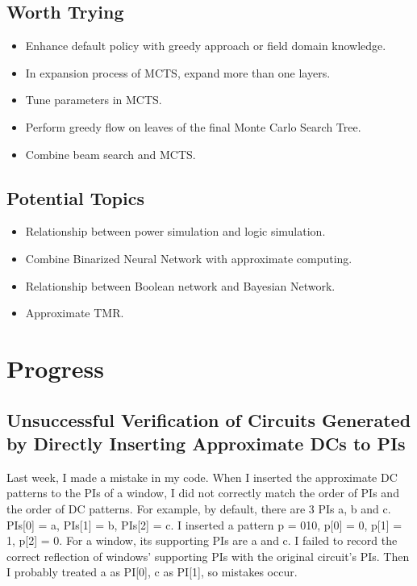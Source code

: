 \documentclass{rpt}
\begin{document}
\subsection{Worth Trying}
\begin{itemize}
    \item Enhance default policy with greedy approach or field domain knowledge.
    \item In expansion process of MCTS, expand more than one layers.
    \item Tune parameters in MCTS\@.
    \item Perform greedy flow on leaves of the final Monte Carlo Search Tree.
    \item Combine beam search and MCTS\@.
\end{itemize}

\subsection{Potential Topics}
\begin{itemize}
    \item Relationship between power simulation and logic simulation.
    \item Combine Binarized Neural Network with approximate computing.
    \item Relationship between Boolean network and Bayesian Network.
    \item Approximate TMR\@.
\end{itemize}

\section{Progress}

\subsection{Unsuccessful Verification of Circuits Generated by Directly Inserting Approximate DCs to PIs}
Last week,
I made a mistake in my code.
When I inserted the approximate DC patterns to the PIs of a window,
I did not correctly match the order of PIs and the order of DC patterns.
For example,
by default,
there are 3 PIs a, b and c.
PIs[0] = a, PIs[1] = b, PIs[2] = c.
I inserted a pattern p = 010,
p[0] = 0, p[1] = 1, p[2] = 0.
For a window,
its supporting PIs are a and c.
I failed to record the correct reflection of windows' supporting PIs with the original circuit's PIs.
Then I probably treated a as PI[0], c as PI[1],
so mistakes occur.
\end{document}
